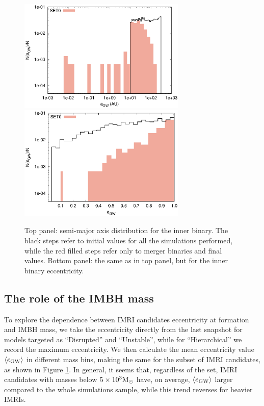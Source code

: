 \documentclass[useAMS,usenatbib]{mn2e}
\newcommand{\Ms}{{\rm M}_\odot}
\newcommand{\gw}{{\rm GW}}
\begin{document}
\begin{figure}
\centering
\includegraphics[width=8cm]{semiaxis}\\
\includegraphics[width=8cm]{ecce}
\caption{Top panel: semi-major axis distribution for the inner binary. The black steps refer to initial values for all the simulations performed, while the red filled steps refer only to merger binaries and final values. Bottom panel: the same as in top panel, but for the inner binary eccentricity.}
\label{fig:f4}
\end{figure}

\subsection{The role of the IMBH mass}

To explore the dependence between IMRI candidates eccentricity at formation and IMBH mass, we take the eccentricity directly from the last snapshot for models targeted as ``Disrupted'' and ``Unstable'', while for ``Hierarchical'' we record the maximum eccentricity. We then calculate the mean eccentricity value $\langle e_\gw\rangle$  in different mass bins, making the same for the subset of IMRI candidates, as shown in Figure \ref{fig:f4}. In general, it seems that, regardless of the set, IMRI candidates with masses below $5\times10^3\Ms$ have, on average, $\langle e_\gw\rangle$ larger compared to the whole simulations sample, while this trend reverses for heavier IMRIs. 
\end{document}
